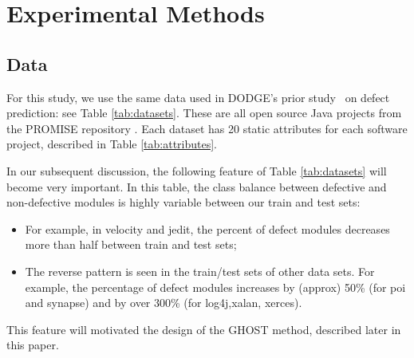 \documentclass[10pt,compsoc,twocolumn]{IEEEtran}
\newcommand{\bi}{\begin{itemize}}
\newcommand{\ei}{\end{itemize}}
\begin{document}
\section{Experimental Methods}
\subsection{Data}
For this study, we use the same data used in DODGE's prior study~\cite{agrawal2019dodge} on defect prediction: see Table \ref{tab:datasets}. These are all open source Java projects from  the PROMISE repository \cite{Sayyad-Shirabad+Menzies:2005}.  Each dataset has 20 static attributes for each software project, described in Table \ref{tab:attributes}.

In our subsequent discussion, the
following feature of  Table \ref{tab:datasets} will become very important. In this table,  the  class balance    between defective and non-defective modules is highly variable between our train and test sets:
\bi
\item For example,   in velocity  and jedit, the percent of defect modules decreases more than half between train and test sets;
\item The reverse pattern is seen in the train/test sets of other data sets.
For example,  the percentage of defect modules
increases by (approx) 50\% (for poi and synapse) and by over 300\% (for log4j,xalan, xerces). 
\ei
 This feature will  motivated the design of the GHOST method, described later in this paper.
\end{document}
